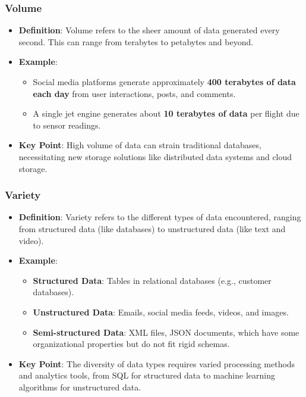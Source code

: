 \documentclass[aspectratio=169]{beamer}
\begin{document}
\begin{frame}[fragile]
    \frametitle{Volume}
    \begin{itemize}
        \item \textbf{Definition}: Volume refers to the sheer amount of data generated every second. This can range from terabytes to petabytes and beyond.
        \item \textbf{Example}:
        \begin{itemize}
            \item Social media platforms generate approximately \textbf{400 terabytes of data each day} from user interactions, posts, and comments.
            \item A single jet engine generates about \textbf{10 terabytes of data} per flight due to sensor readings.
        \end{itemize}
        \item \textbf{Key Point}: High volume of data can strain traditional databases, necessitating new storage solutions like distributed data systems and cloud storage.
    \end{itemize}
\end{frame}

\begin{frame}[fragile]
    \frametitle{Variety}
    \begin{itemize}
        \item \textbf{Definition}: Variety refers to the different types of data encountered, ranging from structured data (like databases) to unstructured data (like text and video).
        \item \textbf{Example}:
        \begin{itemize}
            \item \textbf{Structured Data}: Tables in relational databases (e.g., customer databases).
            \item \textbf{Unstructured Data}: Emails, social media feeds, videos, and images.
            \item \textbf{Semi-structured Data}: XML files, JSON documents, which have some organizational properties but do not fit rigid schemas.
        \end{itemize}
        \item \textbf{Key Point}: The diversity of data types requires varied processing methods and analytics tools, from SQL for structured data to machine learning algorithms for unstructured data.
    \end{itemize}
\end{frame}
\end{document}
